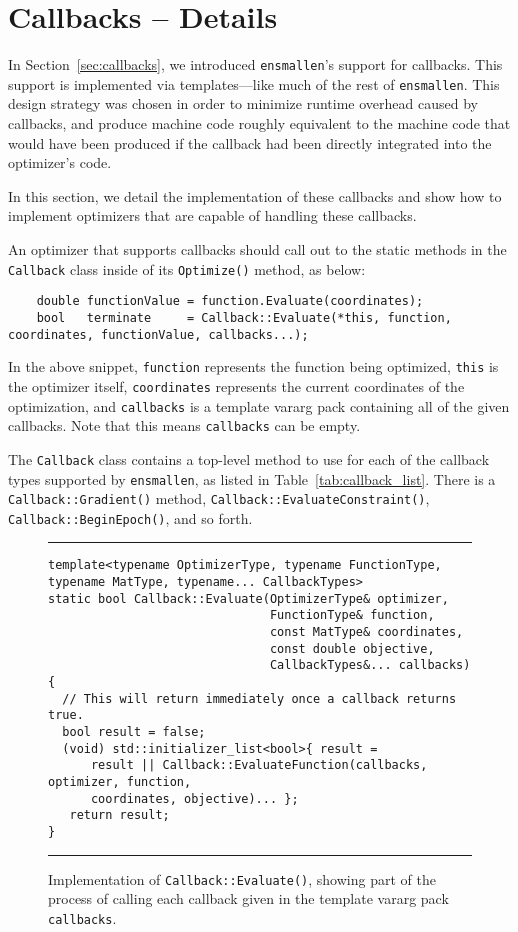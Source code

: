 \section{Callbacks -- Details}
\label{sec:callback_details}

In Section~\ref{sec:callbacks}, we introduced {\tt ensmallen}'s support for
callbacks.  This support is implemented via templates---like much of the rest of
{\tt ensmallen}.  This design strategy was chosen in order to minimize runtime
overhead caused by callbacks, and produce machine code roughly equivalent to the
machine code that would have been produced if the callback had been directly
integrated into the optimizer's code.

In this section, we detail the implementation of these callbacks and show how to
implement optimizers that are capable of handling these callbacks.

An optimizer that supports callbacks should call out to the static methods in
the {\tt Callback} class inside of its {\tt Optimize()} method, as below:
%
\begin{verbatim}
    double functionValue = function.Evaluate(coordinates);
    bool   terminate     = Callback::Evaluate(*this, function, coordinates, functionValue, callbacks...);
\end{verbatim}

In the above snippet, {\tt function} represents the function being optimized,
{\tt *this} is the optimizer itself, {\tt coordinates} represents the current
coordinates of the optimization, and {\tt callbacks} is a template vararg pack
containing all of the given callbacks.
Note that this means {\tt callbacks} can be empty.

The {\tt Callback} class contains a top-level method to use for each of the
callback types supported by {\tt ensmallen}, as listed in Table~\ref{tab:callback_list}.
There is a {\tt Callback::Gradient()} method, {\tt Callback::EvaluateConstraint()},
{\tt Callback::BeginEpoch()}, and so forth. 

\begin{figure}[b!]
\hrule
\vspace{1ex}
\begin{verbatim}
template<typename OptimizerType, typename FunctionType, typename MatType, typename... CallbackTypes>
static bool Callback::Evaluate(OptimizerType& optimizer,
                               FunctionType& function,
                               const MatType& coordinates,
                               const double objective,
                               CallbackTypes&... callbacks)
{
  // This will return immediately once a callback returns true.
  bool result = false;
  (void) std::initializer_list<bool>{ result =
      result || Callback::EvaluateFunction(callbacks, optimizer, function,
      coordinates, objective)... };
   return result;
}
\end{verbatim}
\hrule
\vspace*{-0.5em}
\caption{Implementation of {\tt Callback::Evaluate()},
showing part of the process of calling each callback
given in the template vararg pack {\tt callbacks}.
}
\label{fig:callback_evaluate}
\end{figure}

